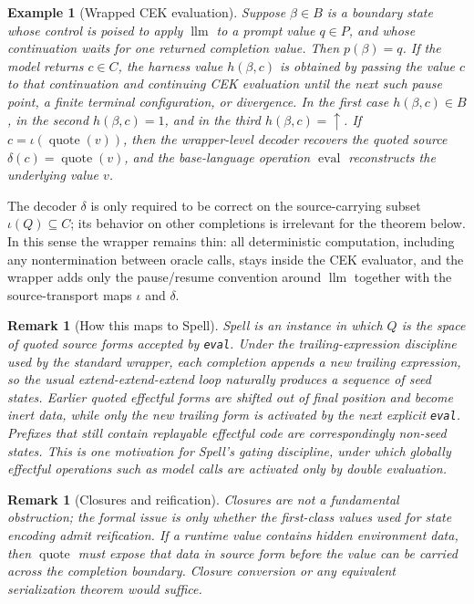 \documentclass[11pt]{article}
\newtheorem{remark}[definition]{Remark}
\newtheorem{example}[definition]{Example}
\newcommand{\eval}{\operatorname{eval}}
\newcommand{\quoteop}{\operatorname{quote}}
\newcommand{\llm}{\operatorname{llm}}
\begin{document}
\begin{example}[Wrapped CEK evaluation]
Suppose $\beta\in B$ is a boundary state whose control is poised to apply $\llm$ to a prompt value $q\in P$, and whose continuation waits for one returned completion value. Then $p(\beta)=q$. If the model returns $c\in C$, the harness value $h(\beta,c)$ is obtained by passing the value $c$ to that continuation and continuing CEK evaluation until the next such pause point, a finite terminal configuration, or divergence. In the first case $h(\beta,c)\in B$, in the second $h(\beta,c)=1$, and in the third $h(\beta,c)=\uparrow$. If $c=\iota(\quoteop(v))$, then the wrapper-level decoder recovers the quoted source $\delta(c)=\quoteop(v)$, and the base-language operation $\eval$ reconstructs the underlying value $v$.
\end{example}

The decoder $\delta$ is only required to be correct on the source-carrying subset $\iota(Q)\subseteq C$; its behavior on other completions is irrelevant for the theorem below. In this sense the wrapper remains thin: all deterministic computation, including any nontermination between oracle calls, stays inside the CEK evaluator, and the wrapper adds only the pause/resume convention around $\llm$ together with the source-transport maps $\iota$ and $\delta$.

\begin{remark}[How this maps to Spell]
Spell is an instance in which $Q$ is the space of quoted source forms accepted by \texttt{eval}. Under the trailing-expression discipline used by the standard wrapper, each completion appends a new trailing expression, so the usual extend-extend-extend loop naturally produces a sequence of seed states. Earlier quoted effectful forms are shifted out of final position and become inert data, while only the new trailing form is activated by the next explicit \texttt{eval}. Prefixes that still contain replayable effectful code are correspondingly non-seed states. This is one motivation for Spell's gating discipline, under which globally effectful operations such as model calls are activated only by double evaluation.
\end{remark}

\begin{remark}[Closures and reification]
Closures are not a fundamental obstruction; the formal issue is only whether the first-class values used for state encoding admit reification. If a runtime value contains hidden environment data, then $\quoteop$ must expose that data in source form before the value can be carried across the completion boundary. Closure conversion or any equivalent serialization theorem would suffice.
\end{remark}
\end{document}
